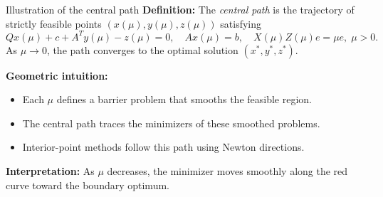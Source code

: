 \begin{frame}{Illustration of the central path}
\textbf{Definition:} The \emph{central path} is the trajectory of strictly feasible points $(x(\mu), y(\mu), z(\mu))$ satisfying
\[
Qx(\mu) + c + A^T y(\mu) - z(\mu) = 0, \quad Ax(\mu) = b, \quad X(\mu) Z(\mu)e = \mu e,\; \mu>0.
\]
As $\mu \to 0$, the path converges to the optimal solution $(x^*,y^*,z^*)$.

\vspace{2mm}
\textbf{Geometric intuition:}
\begin{itemize}
  \item Each $\mu$ defines a barrier problem that smooths the feasible region.
  \item The central path traces the minimizers of these smoothed problems.
  \item Interior-point methods follow this path using Newton directions.
\end{itemize}


\vspace{1mm}
\textbf{Interpretation:} As $\mu$ decreases, the minimizer moves smoothly along the red curve toward the boundary optimum.
\end{frame}

